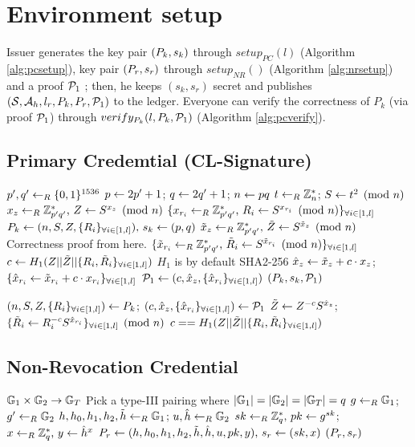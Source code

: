\documentclass{article}
\begin{document}
\section{Environment setup}
Issuer generates the key pair $(P_{k}, s_{k})$ through $setup_{PC}(l)$ (Algorithm \ref{alg:pcsetup}), key pair $(P_{r}, s_{r})$ through $setup_{NR}()$ (Algorithm \ref{alg:nrsetup}) and a proof $\mathcal{P}_{1}$ ; then, he keeps $(s_{k}, s_{r})$ secret and publishes $(\mathcal{S}, \mathcal{A}_{h} , l_{r}, P_{k}, P_{r}, \mathcal{P}_{1})$ to the ledger. Everyone can verify the correctness of $P_{k}$ (via proof $\mathcal{P}_{1}$) through $verify_{P_{k}}(l, P_{k}, \mc{P}_{1})$ (Algorithm \ref{alg:pcverify}).

\subsection{Primary Credemtial (CL-Signature)}

\begin{algorithm}
\caption{$setup_{PC}(l)$}
\label{alg:pcsetup}
\begin{algorithmic}
	\State $p',q'\leftarrow _{R} \{0, 1\}^{1536}$
	\State $p\leftarrow 2p'+1$; $q\leftarrow 2q'+1$; $n\leftarrow pq$
	\State $t\leftarrow _{R} \mathbb{Z}_{n}^{*}$; $S\leftarrow t^2\pmod{n}$
	\State $x_{z}\leftarrow _{R} \mathbb{Z}_{p'q'}^{*}\mbox{, }Z\leftarrow S^{x_{z}}\pmod{n}$
	\State $\{x_{r_i}\leftarrow _{R} \mathbb{Z}_{p'q'}^{*}\mbox{, }R_{i}\leftarrow S^{x_{r_i}}\pmod{n}\}_{\forall i\in [1,l]}$
	\State $P_{k}\leftarrow {(n, S, Z, \{R_i\}_{\forall i\in [1,l]})}\mbox{, }s_{k}\leftarrow {(p,q)}$
	\State $\tilde{x}_{z}\leftarrow _{R} \mathbb{Z}_{p'q'}^{*}\mbox{, }\tilde{Z}\leftarrow S^{\tilde{x}_{z}}\pmod{n}$
	\Comment Correctness proof from here.
	\State $\{\tilde{x}_{r_i}\leftarrow _{R} \mathbb{Z}_{p'q'}^{*}\mbox{, }\tilde{R}_{i}\leftarrow S^{\tilde{x}_{r_i}}\pmod{n}\}_{\forall i\in [1,l]}$
	\State $c\leftarrow H_{1}(Z||\tilde{Z}||\{R_i,\tilde{R}_i\}_{\forall i\in [1,l]})$
	\Comment $H_1$ is by default SHA2-256
	\State $\hat{x}_{z}\leftarrow \tilde{x}_{z} + c\cdot x_{z}$; $\{\hat{x}_{r_{i}}\leftarrow \tilde{x}_{r_{i}} + c\cdot x_{r_{i}}\}_{\forall i\in [1,l]}$
	\State $\mathcal{P}_{1}\leftarrow (c, \hat{x}_{z}, \{ \hat{x}_{r_{i}}\}_{\forall i\in [1,l]})$
	\State \Return $(P_{k}, s_{k}, \mathcal{P}_{1})$
\end{algorithmic}
\end{algorithm}

\begin{algorithm}
\caption{$verify_{P_{k}}(l, P_{k}, \mc{P}_{1})$}
\label{alg:pcverify}
\begin{algorithmic}
	\State $(n, S, Z, \{R_i\}_{\forall i\in [1,l]}) \leftarrow P_{k}$; $(c, \hat{x}_{z}, \{ \hat{x}_{r_{i}}\}_{\forall i\in [1,l]}) \leftarrow \mathcal{P}_{1}$
	\State $\tilde{Z}_{}\leftarrow Z_{}^{-c}S^{\hat{x}{_{z}}}$; $\{\tilde{R}_{i}\leftarrow R_{i}^{-c}S^{\hat{x}{_{r_{i}}}}\}_{\forall i\in [1,l]}\pmod{n}$
	\State \Return $c==H_{1}(Z||\tilde{Z}||\{R_i,\tilde{R}_i\}_{\forall i\in [1,l]})$
\end{algorithmic}
\end{algorithm}
\clearpage
\subsection{Non-Revocation Credential}
\begin{algorithm}
\caption{$setup_{NR}()$}
\label{alg:nrsetup}
\begin{algorithmic}
	\State $\mathbb{G}_{1}\times \mathbb{G}_{2} \rightarrow \mathbb{G}_{T}$
	\Comment Pick a type-III pairing where $|\mathbb{G}_{1}|=|\mathbb{G}_{2}|=|\mathbb{G}_{T}|=q$
	\State $g\leftarrow _{R} \mathbb{G}_{1}$; $g'\leftarrow _{R} \mathbb{G}_{2}$
	\State $h, h_0, h_1, h_2, \tilde{h}\leftarrow _{R} \mathbb{G}_{1}$; $u, \hat{h}\leftarrow _{R} \mathbb{G}_{2}$
	\State $sk\leftarrow _{R} \mathbb{Z}_{q}^{*}\mbox{, }pk\leftarrow g^{sk}$; $x\leftarrow _{R} \mathbb{Z}_{q}^{*}\mbox{, }y\leftarrow \hat{h}^{x}$
	\State $P_{r}\leftarrow {(h, h_0, h_1, h_2, \tilde{h}, \hat{h}, u, pk, y)}\mbox{, }s_{r}\leftarrow {(sk, x)}$
	\State \Return $(P_{r}, s_{r})$
\end{algorithmic}
\end{algorithm}
\end{document}
